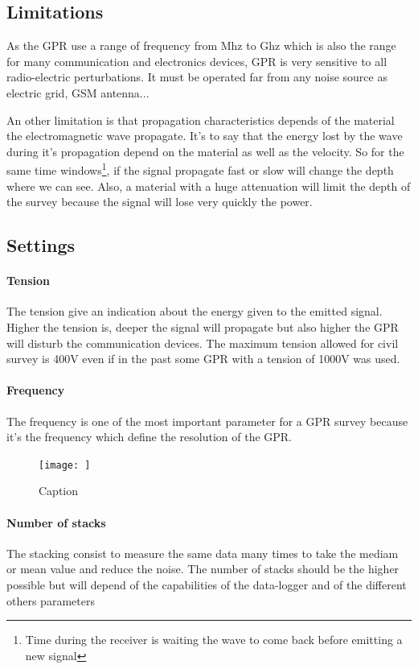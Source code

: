 \subsection{Limitations}

As the GPR use a range of frequency from Mhz to Ghz which is also the range for many communication and electronics devices, GPR is very sensitive to all radio-electric perturbations. It must be operated far from any noise source as electric grid, GSM antenna...

An other limitation is that propagation characteristics depends of the material the electromagnetic wave propagate. It's to say that the energy lost by the wave during it's propagation depend on the material as well as the velocity. So for the same time windows\footnote{Time during the receiver is waiting the wave to come back before emitting a new signal}, if the signal propagate fast or slow will change the depth where we can see. Also, a material with a huge attenuation will limit the depth of the survey because the signal will lose very quickly the power.

\subsection{Settings}


\paragraph{Tension} The tension give an indication about the energy given to the emitted signal. Higher the tension is, deeper the signal will propagate but also higher the GPR will disturb the communication devices. The maximum tension allowed for civil survey is 400V even if in the past some GPR with a tension of 1000V was used. 

\paragraph{Frequency} The frequency is one of the most important parameter for a GPR survey because it's the frequency which define the resolution of the GPR. 

\begin{figure}
    \centering
    \texttt{[image: ]}
    \caption{Caption}
    \label{fig:my_label}
\end{figure}

\paragraph{Number of stacks} The stacking consist to measure the same data many times to take the mediam or mean value and reduce the noise. The number of stacks should be the higher possible but will depend of the capabilities of the data-logger and of the different others parameters

